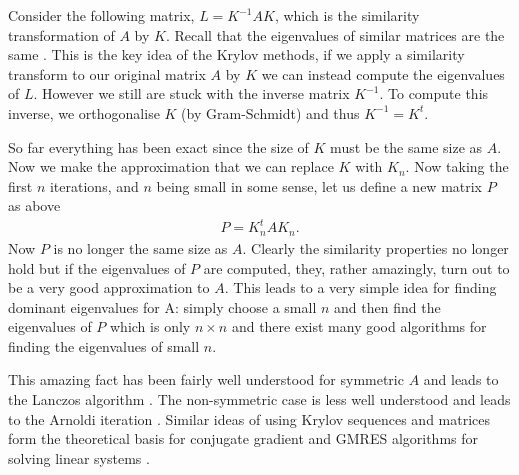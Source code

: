 Consider the following matrix, $L=K^{-1}AK$, which is the similarity transformation of $A$ by $K$. Recall that the eigenvalues of similar matrices are the same \cite{MeyerLinAlg}. This is the key idea of the Krylov methods, if we apply a similarity transform to our original matrix $A$ by $K$ we can instead compute the eigenvalues of $L$. However we still are stuck with the inverse matrix $K^{-1}$. To compute this inverse, we orthogonalise $K$ (by Gram-Schmidt) and thus $K^{-1}=K^{t}$. 

So far everything has been exact since the size of $K$ must be the same size as $A$. Now we make the approximation that we can replace $K$ with $K_{n}$. Now taking the first $n$ iterations, and $n$ being small in some sense, let us define a new matrix $P$ as above
\begin{align}
P=K_{n}^{t}AK_{n}.
\end{align}
Now $P$ is no longer the same size as $A$. Clearly the similarity properties no longer hold but if the eigenvalues of $P$ are computed, they, rather amazingly, turn out to be a very good approximation to $A$. This leads to a very simple idea for finding dominant eigenvalues for A: simply choose a small $n$ and then find the eigenvalues of $P$ which is only $n\times n$ and there exist many good algorithms for finding the eigenvalues of small $n$. 

This amazing fact has been fairly well understood for symmetric $A$ and leads to the Lanczos algorithm \cite{MeyerLinAlg}. The non-symmetric case is less well understood and leads to the Arnoldi iteration \cite{MeyerLinAlg}. Similar ideas of using Krylov sequences and matrices form the theoretical basis for conjugate gradient and GMRES algorithms for solving linear systems \cite{watkins2007matrix}.


